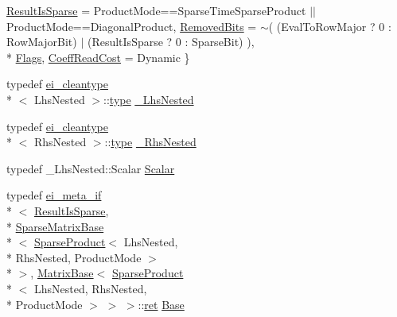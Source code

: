 \begin{DoxyCompactItemize}
\hyperlink{structei__traits_3_01_sparse_product_3_01_lhs_nested_00_01_rhs_nested_00_01_product_mode_01_4_01_4_adb12d2c934b57da4163f3aa6a57800a2a1879f516b4ebcbc245d678004c5373c2}{Result\-Is\-Sparse} = Product\-Mode==Sparse\-Time\-Sparse\-Product $|$$|$ Product\-Mode==Diagonal\-Product, 
\hyperlink{structei__traits_3_01_sparse_product_3_01_lhs_nested_00_01_rhs_nested_00_01_product_mode_01_4_01_4_adb12d2c934b57da4163f3aa6a57800a2a53999c1ec34f908578bab515950a34ec}{Removed\-Bits} = $\sim$( (Eval\-To\-Row\-Major ? 0 \-: Row\-Major\-Bit) $|$ (Result\-Is\-Sparse ? 0 \-: Sparse\-Bit) ), 
\\*
\hyperlink{structei__traits_3_01_sparse_product_3_01_lhs_nested_00_01_rhs_nested_00_01_product_mode_01_4_01_4_adb12d2c934b57da4163f3aa6a57800a2a7ad840b220604d295b0d4acca0257c5e}{Flags}, 
\hyperlink{structei__traits_3_01_sparse_product_3_01_lhs_nested_00_01_rhs_nested_00_01_product_mode_01_4_01_4_adb12d2c934b57da4163f3aa6a57800a2ae4e8f803f4ac287f300761731e99b51c}{Coeff\-Read\-Cost} = Dynamic
 \}
\item 
typedef \hyperlink{structei__cleantype}{ei\-\_\-cleantype}\\*
$<$ Lhs\-Nested $>$\-::\hyperlink{glext_8h_a7d05960f4f1c1b11f3177dc963a45d86}{type} \hyperlink{structei__traits_3_01_sparse_product_3_01_lhs_nested_00_01_rhs_nested_00_01_product_mode_01_4_01_4_af898ee594161d9fd735ea646f3f9b086}{\-\_\-\-Lhs\-Nested}
\item 
typedef \hyperlink{structei__cleantype}{ei\-\_\-cleantype}\\*
$<$ Rhs\-Nested $>$\-::\hyperlink{glext_8h_a7d05960f4f1c1b11f3177dc963a45d86}{type} \hyperlink{structei__traits_3_01_sparse_product_3_01_lhs_nested_00_01_rhs_nested_00_01_product_mode_01_4_01_4_a1ff0fdadc9a06c66c6d5e93e5f4bfb39}{\-\_\-\-Rhs\-Nested}
\item 
typedef \-\_\-\-Lhs\-Nested\-::\-Scalar \hyperlink{structei__traits_3_01_sparse_product_3_01_lhs_nested_00_01_rhs_nested_00_01_product_mode_01_4_01_4_ac8f0d0cafd9a298c2f00261779f2aa15}{Scalar}
\item 
typedef \hyperlink{structei__meta__if}{ei\-\_\-meta\-\_\-if}\\*
$<$ \hyperlink{structei__traits_3_01_sparse_product_3_01_lhs_nested_00_01_rhs_nested_00_01_product_mode_01_4_01_4_adb12d2c934b57da4163f3aa6a57800a2a1879f516b4ebcbc245d678004c5373c2}{Result\-Is\-Sparse}, \\*
\hyperlink{class_sparse_matrix_base}{Sparse\-Matrix\-Base}\\*
$<$ \hyperlink{class_sparse_product}{Sparse\-Product}$<$ Lhs\-Nested, \\*
Rhs\-Nested, Product\-Mode $>$\\*
 $>$, \hyperlink{class_matrix_base}{Matrix\-Base}$<$ \hyperlink{class_sparse_product}{Sparse\-Product}\\*
$<$ Lhs\-Nested, Rhs\-Nested, \\*
Product\-Mode $>$ $>$ $>$\-::\hyperlink{group___i_p_conn_plugin_gabc99fe6afec1a75ccff1092e47375a40}{ret} \hyperlink{structei__traits_3_01_sparse_product_3_01_lhs_nested_00_01_rhs_nested_00_01_product_mode_01_4_01_4_aa4c65bac4c417e32ad67aef520b8c5ea}{Base}
\end{DoxyCompactItemize}


